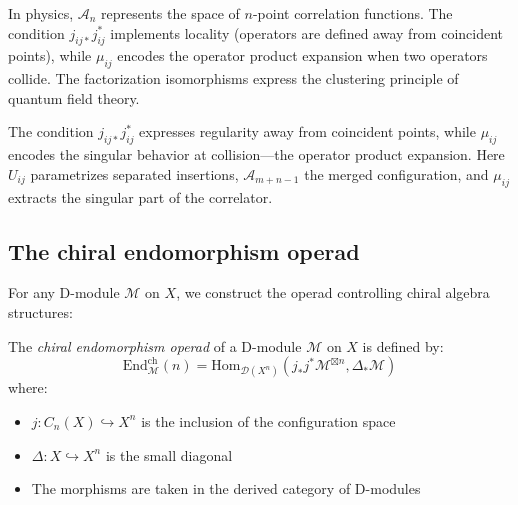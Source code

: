 \begin{remark}
In physics, $\mathcal{A}_n$ represents the space of $n$-point correlation functions. The condition 
$j_{ij*}j_{ij}^*$ implements locality (operators are defined away from coincident points), while 
$\mu_{ij}$ encodes the operator product expansion when two operators collide. The factorization 
isomorphisms express the clustering principle of quantum field theory.
\end{remark}

\begin{remark}
The condition $j_{ij*}j_{ij}^*$ expresses regularity away from coincident points, while $\mu_{ij}$ encodes the singular behavior at collision---the operator product expansion.  Here $U_{ij}$ parametrizes separated insertions, $\mathcal{A}_{m+n-1}$ the merged configuration, and $\mu_{ij}$ extracts the singular part of the correlator.
\end{remark}

\subsection{The chiral endomorphism operad}
 
For any D-module $\mathcal{M}$ on $X$, we construct the operad controlling chiral algebra structures:
 
\begin{definition}\label{def:chiral-endo}
The \emph{chiral endomorphism operad} of a D-module $\mathcal{M}$ on $X$ is defined by:
\[
\text{End}_{\mathcal{M}}^{\text{ch}}(n) = \text{Hom}_{\mathcal{D}(X^n)}\left(j_*j^*\mathcal{M}^{\boxtimes n}, \Delta_*\mathcal{M}\right)
\]
where:
\begin{itemize}
\item $j: C_n(X) \hookrightarrow X^n$ is the inclusion of the configuration space
\item $\Delta: X \hookrightarrow X^n$ is the small diagonal
\item The morphisms are taken in the derived category of D-modules
\end{itemize}
\end{definition}
 
